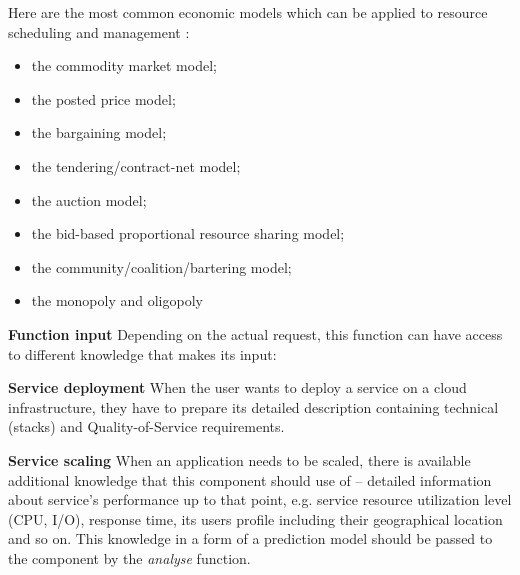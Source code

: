 \begin{asparaenum}
\begin{itemize}
      Here are the most common economic models which can be applied to resource scheduling and management \cite{buyya2002economic}:
      \begin{itemize}
        \item the commodity market model;
        \item the posted price model;
        \item the bargaining model;
        \item the tendering/contract-net model;
        \item the auction model;
        \item the bid-based proportional resource sharing model;
        \item the community/coalition/bartering model;
        \item the monopoly and oligopoly
      \end{itemize}
  \end{itemize}

\item[\textbf{Function input}] Depending on the actual request, this function can have access to different knowledge that makes its input:

  \begin{asparaenum}
  \item[\textbf{Service deployment}] When the user wants to deploy a service on a cloud infrastructure, they have to prepare its detailed description containing technical (stacks) and Quality-of-Service requirements.
  \item[\textbf{Service scaling}] When an application needs to be scaled, there is available additional knowledge that this component should use of -- detailed information about service's performance up to that point, e.g. service resource utilization level (CPU, I/O), response time, its users profile including their geographical location and so on. This knowledge in a form of a prediction model should be passed to the component by the \emph{analyse} function.
  \end{asparaenum}


\end{asparaenum}
